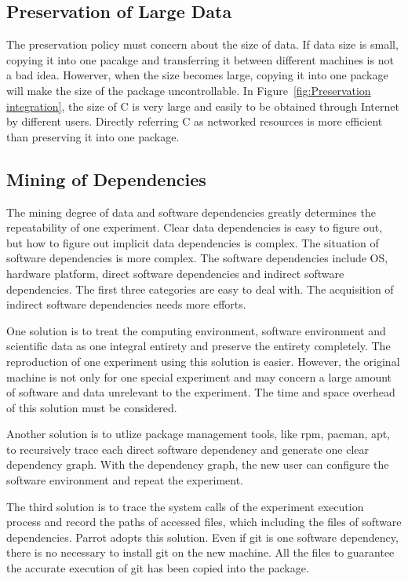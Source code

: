 \documentclass{sig-alternate}
\begin{document}
\subsection{Preservation of Large Data}

The preservation policy must concern about the size of data. If data size is
small, copying it into one pacakge and transferring it between different
machines is not a bad idea. Howerver, when the size becomes large, copying it
into one package will make the size of the package uncontrollable. In
Figure~\ref{fig:Preservation integration}, the size of C is very large and
easily to be obtained through Internet by different users. Directly referring C
as networked resources is more efficient than preserving it into one package.

\subsection{Mining of Dependencies} 

The mining degree of data and software dependencies greatly determines the
repeatability of one experiment. Clear data dependencies is easy to figure
out, but how to figure out implicit data dependencies is complex. The situation
of software dependencies is more complex. The software dependencies include OS,
hardware platform, direct software dependencies and indirect software
dependencies.
The first
three categories are easy to deal with. The acquisition of indirect software
dependencies needs more efforts. 

One solution is to treat the computing environment, software environment
and scientific data as one integral entirety and preserve the entirety
completely. The reproduction of one experiment using this solution is easier.
However, the original machine is not only for one special experiment and may
concern a large amount of software and data unrelevant to the experiment. The
time and space overhead of this solution must be considered.

Another solution is to utlize package management
tools, like rpm, pacman, apt, to recursively trace each direct software
dependency and generate one clear dependency graph. With the dependency graph,
the new user can configure the software environment and repeat the experiment.

The third solution is to trace the system calls of the experiment execution process
and record the paths of accessed files, which including the files of software dependencies.
Parrot adopts this solution. Even if git is one software dependency, there is no necessary to install git on the new machine.
All the files to guarantee the accurate execution of git has been copied into the package.
\end{document}
